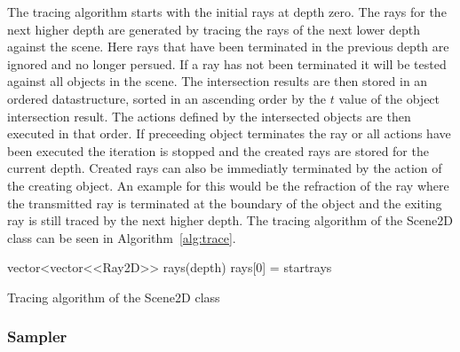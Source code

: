 \documentclass[a4paper,10pt]{article}
\newcommand{\algref}[1]{Algorithm~\ref{#1}}
\begin{document}
    The tracing algorithm starts with the initial rays at depth
    zero.
    The rays for the next higher depth are generated by tracing
    the rays of the next lower depth against the scene.
    Here rays that have been terminated in the previous depth
    are ignored and no longer persued.
    If a ray has not been terminated it will be tested against
    all objects in the scene.
    The intersection results are then stored in an ordered
    datastructure, sorted in an ascending order by the $t$ value
    of the object intersection result.
    The actions defined by the intersected objects are then
    executed in that order.
    If preceeding object terminates the ray or all actions
    have been executed the iteration is stopped and the
    created rays are stored for the current depth.
    Created rays can also be immediatly terminated by the action of 
    the creating object.
    An example for this would be the refraction of the ray where the
    transmitted ray is terminated at the boundary of the object and
    the exiting ray is still traced by the next higher depth. 
    The tracing algorithm of the Scene2D class can be seen in
    \algref{alg:trace}.

    \begin{algorithm}
        \SetAlgoLined
        vector<vector<<Ray2D>> rays(depth)\;
        rays[0] = startrays\;

        \caption{Tracing algorithm of the Scene2D class}
        \label{alg:trace}
    \end{algorithm}

    \subsubsection{Sampler}
\end{document}

